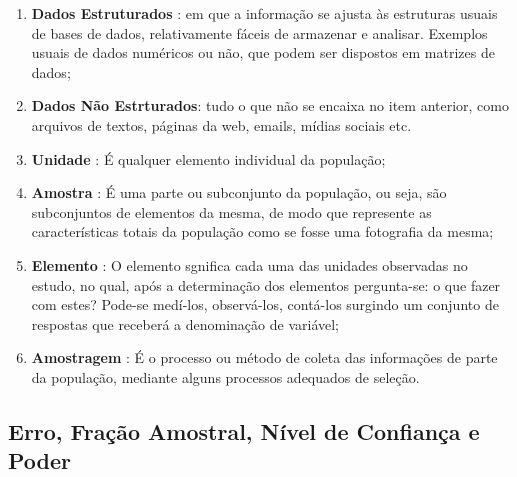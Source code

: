 \begin{enumerate}

\item \textbf{Dados Estruturados} : em que a informação se ajusta às estruturas
usuais de bases de dados, relativamente fáceis de armazenar e analisar.
Exemplos usuais de dados numéricos ou não, que podem ser dispostos
em matrizes de dados;

\item \textbf{Dados Não Estrturados}: tudo o que não se encaixa no item anterior, como arquivos de textos, páginas da web, emails, mídias sociais etc.

\item \textbf{Unidade} : É qualquer elemento individual da população;

\item \textbf{Amostra} : É uma parte ou subconjunto da população,
ou seja, são subconjuntos de elementos da mesma, de modo que
represente as características totais da população como se fosse
uma fotografia da mesma;

\item \textbf{Elemento} : O elemento sgnifica cada uma das
unidades observadas no estudo, no qual, após a determinação dos
elementos pergunta-se: o que fazer com estes? Pode-se medí-los,
observá-los, contá-los surgindo um conjunto de respostas que
receberá a denominação de variável;

 \item \textbf{Amostragem} : É o
processo ou método de coleta das informações de parte da
população, mediante alguns processos adequados de seleção.
\end{enumerate}

\subsection{Erro, Fração Amostral, Nível de Confiança e Poder}


